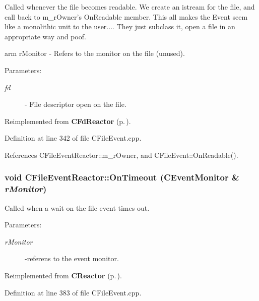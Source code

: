 Called whenever the file becomes readable. We create an istream for the file, and call back to m\_\-r\-Owner's On\-Readable member. This all makes the Event seem like a monolithic unit to the user.... They just subclass it, open a file in an appropriate way and poof.\begin{Desc}
\item[arm r\-Monitor - Refers to the monitor on the file (unused).]\par
 \end{Desc}
\begin{Desc}
\item[Parameters: ]\par
\begin{description}
\item[{\em 
fd}]- File descriptor open on the file. \end{description}
\end{Desc}


Reimplemented from {\bf CFd\-Reactor} {\rm (p.\,\pageref{classCFdReactor_a6})}.

Definition at line 342 of file CFile\-Event.cpp.

References CFile\-Event\-Reactor::m\_\-r\-Owner, and CFile\-Event::On\-Readable().
\subsubsection{\setlength{\rightskip}{0pt plus 5cm}void CFile\-Event\-Reactor::On\-Timeout ({\bf CEvent\-Monitor} \& {\em r\-Monitor})\hspace{0.3cm}{\tt  [virtual]}}\label{classCFileEvent_1_1CFileEventReactor_a5}


Called when a wait on the file event times out. \begin{Desc}
\item[Parameters: ]\par
\begin{description}
\item[{\em 
r\-Monitor}]-referens to the event monitor. \end{description}
\end{Desc}


Reimplemented from {\bf CReactor} {\rm (p.\,\pageref{classCReactor_a8})}.

Definition at line 383 of file CFile\-Event.cpp.

